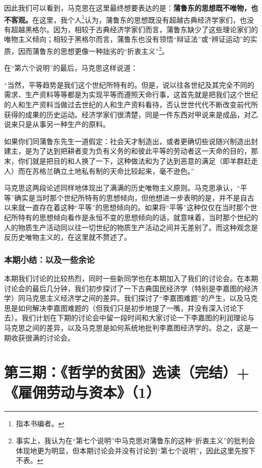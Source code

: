 \documentclass[a4paper,twoside,12pt,AutoFakeBold]{ctexart}
\begin{document}
因此我们可以看到，马克思在这里最终想要表达的是：\textbf{蒲鲁东的思想既不唯物，也不客观。}在这里，我个人\footnote{指本书编者。}认为，蒲鲁东的思想既没有超越古典经济学家们，也没有超越黑格尔。因为，相较于古典经济学家们而言，蒲鲁东缺少了这些理论家们的唯物主义倾向；相较于黑格尔而言，蒲鲁东也没有领悟“辩证法”或“辨证运动”的实质，因而蒲鲁东的思想更像一种拙劣的“折衷主义”\footnote{事实上，我认为在“第七个说明”中马克思对蒲鲁东的这种“折衷主义”的批判会体现地更为明显，但本期讨论会并没有讨论到“第七个说明”，因此这里先按下不表。}。

在“第六个说明”的最后，马克思这样说道：
\begin{adjustwidth}{2em}{2em}
    \qquad\fangsong
    “当然，平等趋势是我们这个世纪所特有的。但是，说以往各世纪及其完全不同的需求、生产资料等等都是为实现平等而遵照天命行事，这首先就是把我们这个世纪的人和生产资料当做过去世纪的人和生产资料看待，否认世世代代不断改变前代所获得的成果的历史运动。经济学家们很清楚，同是一件东西对甲说来是成品，对乙说来只是从事另一种生产的原料。
    
    如果你们同蒲鲁东先生一道假定：社会天才制造出，或者更确切些说随兴制造出封建主，是为了达到把耕者变为负有义务的和彼此平等的劳动者这一天命的目的，那末，你们就是把目的和人换了一下，这种做法和为了达到恶意的满足（即羊群赶走人）而在苏格兰确立土地私有制的天命比较起来，毫不逊色。”
\end{adjustwidth}

马克思这两段论述同样地体现出了满满的历史唯物主义原则。马克思承认，“平等”确实是当时那个世纪所特有的思想倾向，但他想进一步表明的是，并不是自古以来就一直存在着这种“平等”的思想倾向的。如果将“平等”这种仅仅在当时那个世纪所特有的思想倾向看作是永恒不变的思想倾向的话，就意味着，当时那个世纪的人的物质生产活动同以往一切世纪的物质生产活动之间并无差别了。而这种观念是反历史唯物主义的，在这里就不赘述了。

\subsubsection{本期小结：以及一些余论}
本期我们讨论的比较热烈，同时一些新同学也在本期加入了我们的讨论会。在本期讨论会的最后几分钟，我们初步探讨了一下古典国民经济学（特别是李嘉图的经济学）同马克思主义经济学之间的差异。我们探讨了“李嘉图难题”的产生，以及马克思是如何解决李嘉图难题的（但我们只是初步地提了一嘴，并没有深入讨论下去）。我们计划在下期的讨论会中留一段时间和大家讨论一下李嘉图的利润理论与马克思之间的差异，以及马克思是如何系统地批判李嘉图经济学的。总之，这是一期收获很满的讨论会。
\newpage
\section{第三期：《哲学的贫困》选读（完结）+《雇佣劳动与资本》（1）}
\end{document}
